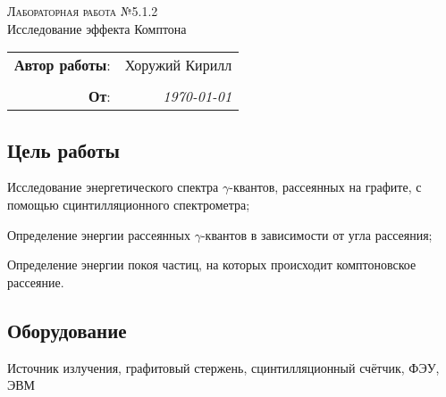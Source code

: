 
\phantom{42}
\vspace{20mm}

\begin{center}
    \LARGE \textsc{Лабораторная работа №5.1.2} \\
    \vspace{3 mm}
    \large Исследование эффекта Комптона
\end{center}


\phantom{42}

\begin{flushright}
    \begin{tabular}{rr}
        \textbf{Автор работы}: 
        & Хоружий Кирилл \\
        & \\
        \textbf{От}: &
        \textit{\today}\\
    \end{tabular}
\end{flushright}

\thispagestyle{empty}

\vspace{10mm}


\subsection*{Цель работы}
\begin{enumerate*}
    \item Исследование энергетического спектра $\gamma$-квантов, рассеянных на графите, с помощью сцинтилляционного спектрометра;
    \item Определение энергии рассеянных $\gamma$-квантов в зависимости от угла рассеяния;
    \item Определение энергии покоя частиц, на которых происходит комптоновское рассеяние.
\end{enumerate*}


\subsection*{Оборудование}
Источник излучения, 
графитовый стержень,
сцинтилляционный счётчик,
ФЭУ,
ЭВМ


\newpage
